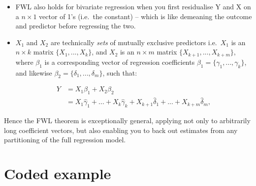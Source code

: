 \documentclass[
]{book}
\begin{document}
\begin{itemize}
\item
  FWL also holds for bivariate regression when you first residualise Y and X on a \(n\times1\) vector of 1's (i.e.~the constant) -- which is like demeaning the outcome and predictor before regressing the two.
\item
  \(X_1\) and \(X_2\) are technically \textit{sets} of mutually exclusive predictors i.e.~\(X_1\) is an \(n \times k\) matrix \(\{X_1,...,X_k\}\), and \(X_2\) is an \(n \times m\) matrix \(\{X_{k+1},...,X_{k+m}\}\), where \(\beta_1\) is a corresponding vector of regression coefficients \(\beta_1 = \{\gamma_1,...,\gamma_k\}\), and likewise \(\beta_2 = \{\delta_1,..., \delta_m\}\), such that:

  \begin{align*}
    Y &= X_1\beta_1 + X_2\beta_2 \\
      &= X_{1}\hat{\gamma}_1 + ... + X_{k}\hat{\gamma}_k + X_{k+1}\hat{\delta}_{1} + ... + X_{k+m}\hat{\delta}_{m},
    \end{align*}
\end{itemize}

Hence the FWL theorem is exceptionally general, applying not only to arbitrarily long coefficient vectors, but also enabling you to back out estimates from any partitioning of the full regression model.

\hypertarget{coded-example}{%
\section{Coded example}\label{coded-example}}
\end{document}
